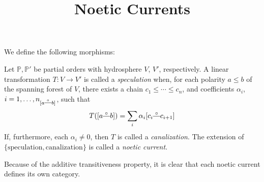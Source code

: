 

\title{Noetic Currents}


	\maketitle
	\par We define the following morphisms:
	\begin{definition}
		Let $\mathbb{P}, \mathbb{P}'$ be partial orders with hydrosphere $V$, $V'$, respectively. A linear transformation $T: V \to V'$ is called a \textit{speculation} when, for each polarity $a \leq b$ of the spanning forest of $V$, there exists a chain $c_1 \leq \cdots \leq c_n$, and coefficients $\alpha_i$, $i = 1, \dots, n_{[a \connect b]}$, such that 
		\[
			T([a \connect b]) = \sum_i \alpha_i [c_i \connect c_{i+1}]
		\] 
		If, furthermore, each $\alpha_i \neq 0$, then $T$ is called a \textit{canalization}.
		The extension of $\{\text{speculation}, \text{canalization}\}$ is called a \textit{noetic current}.
	\end{definition}

	Because of the additive transitiveness property, it is clear that each noetic current defines its own category. 
	
